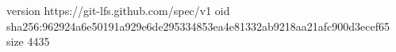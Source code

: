 version https://git-lfs.github.com/spec/v1
oid sha256:962924a6e50191a929e6de295334853ea4e81332ab9218aa21afc900d3ecef65
size 4435
